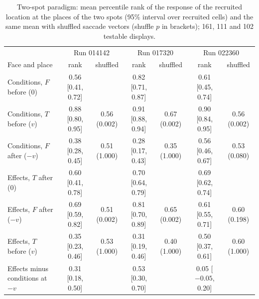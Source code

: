 \documentclass[11pt,a4paper]{article}
\begin{document}
\begin{table}[h]
\centering\footnotesize
\setlength{\tabcolsep}{3pt}
\begin{tabular}{@{}lcccccc@{}}
\toprule
 & \multicolumn{2}{c}{Run 014142} & \multicolumn{2}{c}{Run 017320} & \multicolumn{2}{c}{Run 022360} \\
Face and place & rank & shuffled & rank & shuffled & rank & shuffled \\
\midrule
Conditions, $F$ before (0) & 0.56 [0.41, 0.72] & & 0.82 [0.71, 0.87] & & 0.61 [0.45, 0.74] & \\
Conditions, $T$ before ($v$) & 0.88 [0.80, 0.95] & 0.56 (0.002) & 0.91 [0.88, 0.94] & 0.67 (0.002) & 0.90 [0.84, 0.95] & 0.56 (0.002) \\
Conditions, $F$ after ($-v$) & 0.38 [0.28, 0.45] & 0.51 (1.000) & 0.28 [0.17, 0.43] & 0.35 (1.000) & 0.56 [0.46, 0.67] & 0.53 (0.080) \\
Effects, $T$ after (0) & 0.60 [0.41, 0.78] & & 0.70 [0.64, 0.79] & & 0.69 [0.62, 0.74] & \\
Effects, $F$ after ($-v$) & 0.69 [0.59, 0.82] & 0.51 (0.002) & 0.81 [0.70, 0.89] & 0.65 (0.002) & 0.61 [0.55, 0.71] & 0.60 (0.198) \\
Effects, $T$ before ($v$) & 0.35 [0.23, 0.46] & 0.53 (1.000) & 0.31 [0.19, 0.46] & 0.40 (1.000) & 0.50 [0.37, 0.61] & 0.60 (1.000) \\
Effects minus conditions at $-v$ & 0.31 [0.18, 0.50] & & 0.53 [0.30, 0.70] & & 0.05 [$-0.05$, 0.20] & \\
\bottomrule
\end{tabular}
\caption{Two-spot paradigm: mean percentile rank of the response of the recruited location at the places of the two
spots (95\% interval over recruited cells) and the same mean with shuffled saccade vectors (shuffle $p$ in brackets); 161, 111
and 102 testable displays.}
\label{tab:twospot}
\end{table}
\end{document}
